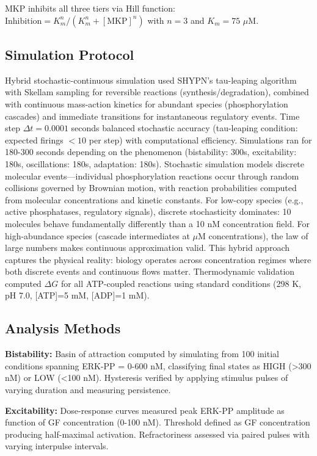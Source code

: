 \documentclass[twocolumn,11pt]{article}
\begin{document}
MKP inhibits all three tiers via Hill function: $\text{Inhibition} = K_m^n / (K_m^n + [\text{MKP}]^n)$ with $n=3$ and $K_m=75$ $\mu$M.

\subsection*{Simulation Protocol}

Hybrid stochastic-continuous simulation used SHYPN's tau-leaping algorithm with Skellam sampling for reversible reactions (synthesis/degradation), combined with continuous mass-action kinetics for abundant species (phosphorylation cascades) and immediate transitions for instantaneous regulatory events. Time step $\Delta t = 0.0001$ seconds balanced stochastic accuracy (tau-leaping condition: expected firings $<10$ per step) with computational efficiency. Simulations ran for 180-300 seconds depending on the phenomenon (bistability: 300s, excitability: 180s, oscillations: 180s, adaptation: 180s). Stochastic simulation models discrete molecular events—individual phosphorylation reactions occur through random collisions governed by Brownian motion, with reaction probabilities computed from molecular concentrations and kinetic constants. For low-copy species (e.g., active phosphatases, regulatory signals), discrete stochasticity dominates: 10 molecules behave fundamentally differently than a 10 nM concentration field. For high-abundance species (cascade intermediates at $\mu$M concentrations), the law of large numbers makes continuous approximation valid. This hybrid approach captures the physical reality: biology operates across concentration regimes where both discrete events and continuous flows matter. Thermodynamic validation computed $\Delta G$ for all ATP-coupled reactions using standard conditions (298 K, pH 7.0, [ATP]=5 mM, [ADP]=1 mM).

\subsection*{Analysis Methods}

\textbf{Bistability:} Basin of attraction computed by simulating from 100 initial conditions spanning ERK-PP = 0-600 nM, classifying final states as HIGH (>300 nM) or LOW (<100 nM). Hysteresis verified by applying stimulus pulses of varying duration and measuring persistence.

\textbf{Excitability:} Dose-response curves measured peak ERK-PP amplitude as function of GF concentration (0-100 nM). Threshold defined as GF concentration producing half-maximal activation. Refractoriness assessed via paired pulses with varying interpulse intervals.
\end{document}
